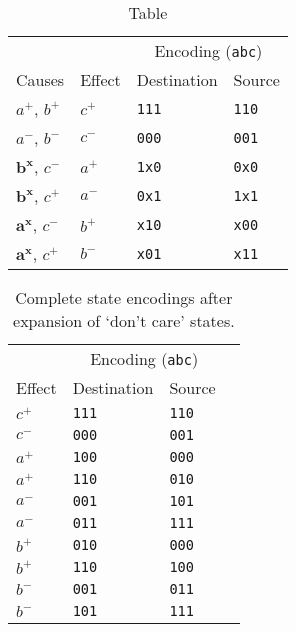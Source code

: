 \begin{table}[ht]
\caption{Table}\label{tab:add_missing}
\centering
\begin{tabular}{@{}llll@{}}
	\toprule
	& & \multicolumn{2}{c}{Encoding (\texttt{abc})}\\ \cmidrule(l){3-4}
	Causes & Effect & Destination & Source\\ \midrule
	$a^{+}$, $b^{+}$		& $c^{+}$ & \texttt{111} & \texttt{110}\\
	$a^{-}$, $b^{-}$ 		& $c^{-}$ & \texttt{000} & \texttt{001}\\
	$\mathbf{b^{x}}$, $c^{-}$	& $a^{+}$ & \texttt{1x0} & \texttt{0x0}\\
	$\mathbf{b^{x}}$, $c^{+}$	& $a^{-}$ & \texttt{0x1} & \texttt{1x1}\\
	$\mathbf{a^{x}}$, $c^{-}$	& $b^{+}$ & \texttt{x10} & \texttt{x00}\\
	$\mathbf{a^{x}}$, $c^{+}$	& $b^{-}$ & \texttt{x01} & \texttt{x11}\\
	\bottomrule
\end{tabular}
\end{table}

\begin{table}[ht]
\caption{Complete state encodings after expansion of `don't care' states.}\label{tab:enc_complete}
\centering
\begin{tabular}{@{}llll@{}}
	\toprule
	& \multicolumn{2}{c}{Encoding (\texttt{abc})}\\ \cmidrule(l){2-3}
	Effect & Destination & Source\\ \midrule
	$c^{+}$ & \texttt{111} & \texttt{110}\\[0.25em]
	$c^{-}$ & \texttt{000} & \texttt{001}\\[0.25em]
	$a^{+}$ & \texttt{100} & \texttt{000}\\
	$a^{+}$ & \texttt{110} & \texttt{010}\\[0.25em]
	$a^{-}$ & \texttt{001} & \texttt{101}\\
	$a^{-}$ & \texttt{011} & \texttt{111}\\[0.25em]
	$b^{+}$ & \texttt{010} & \texttt{000}\\
	$b^{+}$ & \texttt{110} & \texttt{100}\\[0.25em]
	$b^{-}$ & \texttt{001} & \texttt{011}\\
	$b^{-}$ & \texttt{101} & \texttt{111}\\
	\bottomrule
\end{tabular}
\end{table}

